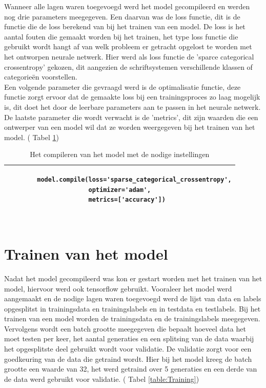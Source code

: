 Wanneer alle lagen waren toegevoegd werd het model gecompileerd en werden nog drie parameters meegegeven.
Een daarvan was de loss functie, dit is de functie die de loss berekend van bij het trainen van een model.
De loss is het aantal fouten die gemaakt worden bij het trainen, het type loss functie die gebruikt wordt hangt af van welk probleem er getracht opgelost te worden met het ontworpen neurale netwerk.
Hier werd als loss functie de 'sparce categorical crossentropy' gekozen, dit aangezien de schriftsystemen verschillende klassen of categorieën voorstellen.\\
Een volgende parameter die gevraagd werd is de optimalisatie functie, deze functie zorgt ervoor dat de gemaakte loss bij een trainingsproces zo laag mogelijk is, dit doet het door de leerbare parameters aan te passen in het neurale netwerk.\\
De laatste parameter die wordt verwacht is de 'metrics', dit zijn waarden die een ontwerper van een model wil dat ze worden weergegeven bij het trainen van het model. ( Tabel \ref{table:Compile})


\begin{table}[!htbp]
    \begin{tabular}{|l|}
        \hline
        \begin{lstlisting}
        model.compile(loss='sparse_categorical_crossentropy',
                      optimizer='adam',
                      metrics=['accuracy'])
        
        \end{lstlisting}
        \\ \hline
    \end{tabular}
    \caption{Het compileren van het model met de nodige instellingen} \label{table:Compile}
\end{table}



\section{Trainen van het model}

Nadat het model gecompileerd was kon er gestart worden met het trainen van het model, hiervoor werd ook tensorflow gebruikt.
Vooraleer het model werd aangemaakt en de nodige lagen waren toegevoegd werd de lijst van data en labels opgesplitst in trainingsdata en trainingslabels en in testdata en testlabels.
Bij het trainen van een model worden de trainingsdata en de trainingslabels meegegeven.
Vervolgens wordt een batch grootte meegegeven die bepaalt hoeveel data het moet testen per keer, het aantal generaties en een splitsing van de data waarbij het opgesplitste deel gebruikt wordt voor validatie.
De validatie zorgt voor een goedkeuring van de data die getraind wordt.
Hier bij het model kreeg de batch grootte een waarde van 32, het werd getraind over 5 generaties en een derde van de data werd gebruikt voor validatie. ( Tabel \ref{table:Training})

